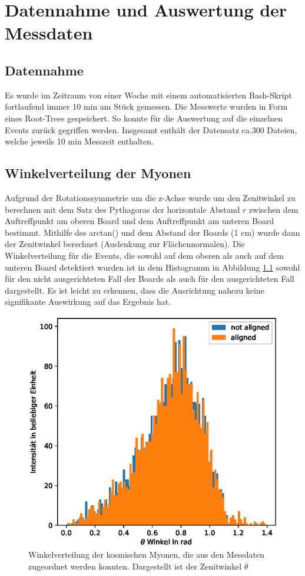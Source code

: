 \documentclass[usenames,dvipsnames]{include/protokollclass}
\begin{document}
	
	\chapter{Datennahme und Auswertung der Messdaten}
	\section{Datennahme}
	Es wurde im Zeitraum von einer Woche mit einem automatisierten Bash-Skript fortlaufend immer 10 min am Stück gemessen. Die Messwerte wurden in Form eines Root-Trees gespeichert. So konnte für die Auswertung auf die einzelnen Events zurück gegriffen werden. Insgesamt enthält der Datensatz ca.300 Dateien, welche jeweils 10 min Messzeit enthalten.
	
	 
	\section{Winkelverteilung der Myonen}
	Aufgrund der Rotationssymmetrie um die z-Achse wurde um den Zenitwinkel zu berechnen mit dem Satz des Pythagoras der horizontale Abstand $r$ zwischen dem Auftreffpunkt am oberen Board und dem Auftreffpunkt am unteren Board bestimmt. Mithilfe des arctan() und dem Abstand der Boards (1 cm) wurde dann der Zenitwinkel berechnet (Auslenkung zur Flächennormalen). Die Winkelverteilung für die Events, die sowohl auf dem oberen als auch auf dem unteren Board detektiert wurden ist in dem Histogramm in Abbildung \ref{fig:winkelverteilung} sowohl für den nicht ausgerichteten Fall der Boards als auch für den ausgerichteten Fall dargestellt. Es ist leicht zu erkennen, dass die Ausrichtung nahezu keine signifikante Auswirkung auf das Ergebnis hat.
	
	\begin{figure}
		\centering
		\includegraphics[width=\textwidth]{fig/winkelverteilung.eps}
		\caption{Winkelverteilung der kosmischen Myonen, die aus den Messdaten zugeordnet werden konnten. Dargestellt ist der Zenitwinkel $\theta$}
		\label{fig:winkelverteilung}
	\end{figure}
	
\end{document}
